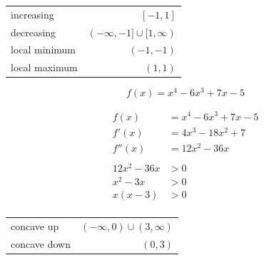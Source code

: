 \documentclass[fleqn,addpoints]{exam}
\begin{document}
\begin{questions}
\begin{solution}[6 cm]
\begin{tabular}{lr}
\toprule
increasing     & $[-1, 1]$ \\
decreasing     & $(-\infty, -1] \cup [1, \infty)$ \\
local minimum  & $(-1, -1)$ \\
local maximum  & $(1, 1)$ \\
\bottomrule
\end{tabular}

\end{solution}





\ifprintanswers
\else
\pagebreak
\fi


\question[5]
\label{concavity:first}
\[
  f(x) = x^4 - 6x^3 + 7x - 5
\]

\begin{solution}[8 cm]
\begin{align*}
  f(x) &= x^4 - 6x^3 + 7x - 5 \\
  f'(x) &= 4x^3 - 18x^2 + 7 \\
  f''(x) &= 12x^2 - 36x \\
\\
  12x^2 - 36x &> 0 \\
  x^2 - 3x &> 0 \\
  x(x - 3) &> 0 \\
\end{align*}

\begin{tabular}{lr}
\toprule
concave up     & $(-\infty, 0) \cup (3, \infty)$ \\
concave down   & $(0, 3)$ \\
\bottomrule
\end{tabular}


\end{solution}
\end{questions}
\end{document}
